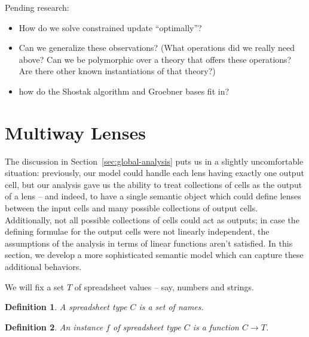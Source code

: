 \documentclass{article}
\newtheorem{definition}{Definition}
\begin{document}
Pending research:
\begin{itemize}
    \item How do we solve constrained update ``optimally''?
    \item Can we generalize these observations? (What operations did we
        really need above? Can we be polymorphic over a theory that offers
        these operations? Are there other known instantiations of that
        theory?)
    \item how do the Shostak algorithm and Groebner bases fit in?
\end{itemize}
\section{Multiway Lenses}
\label{sec:multiway}
The discussion in Section~\ref{sec:global-analysis} puts us in a slightly
uncomfortable situation: previously, our model could handle each lens having
exactly one output cell, but our analysis gave us the ability to treat
collections of cells as the output of a lens -- and indeed, to have a single
semantic object which could define lenses between the input cells and many
possible collections of output cells. Additionally, not all possible
collections of cells could act as outputs; in case the defining formulae for
the output cells were not linearly independent, the assumptions of the
analysis in terms of linear functions aren't satisfied. In this section, we
develop a more sophisticated semantic model which can capture these
additional behaviors. %

We will fix a set $T$ of spreadsheet values -- say, numbers and strings.

\newcommand{\sto}{\mapsto}
\newcommand{\mlens}[1]{\mathcal M(#1)}
\newcommand{\mput}{\mathit{put}}
\newcommand{\danger}{\mathcal D}

\begin{definition}
    A \emph{spreadsheet type} $C$ is a set of names.
\end{definition}

\begin{definition}
    An \emph{instance} $f$ of spreadsheet type $C$ is a function $C \to T$.
\end{definition}
\end{document}
